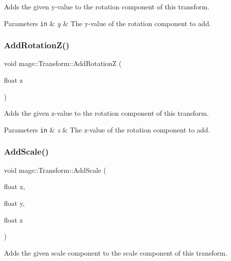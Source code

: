 Adds the given y-\/value to the rotation component of this transform.


\begin{DoxyParams}[1]{Parameters}
\mbox{\tt in}  & {\em y} & The y-\/value of the rotation component to add. \\
\hline
\end{DoxyParams}
\hypertarget{structmage_1_1_transform_ae70e192a7d98366b629c3d75a7d2d3bd}{}\label{structmage_1_1_transform_ae70e192a7d98366b629c3d75a7d2d3bd} 
\subsubsection{\texorpdfstring{Add\+Rotation\+Z()}{AddRotationZ()}}
{\footnotesize\ttfamily void mage\+::\+Transform\+::\+Add\+RotationZ (\begin{DoxyParamCaption}\item[{float}]{z }\end{DoxyParamCaption})}

Adds the given z-\/value to the rotation component of this transform.


\begin{DoxyParams}[1]{Parameters}
\mbox{\tt in}  & {\em z} & The z-\/value of the rotation component to add. \\
\hline
\end{DoxyParams}
\hypertarget{structmage_1_1_transform_a10681b78ac7980fa3aa6c6c11a274f99}{}\label{structmage_1_1_transform_a10681b78ac7980fa3aa6c6c11a274f99} 
\subsubsection{\texorpdfstring{Add\+Scale()}{AddScale()}\hspace{0.1cm}{\footnotesize\ttfamily [1/2]}}
{\footnotesize\ttfamily void mage\+::\+Transform\+::\+Add\+Scale (\begin{DoxyParamCaption}\item[{float}]{x,  }\item[{float}]{y,  }\item[{float}]{z }\end{DoxyParamCaption})}

Adds the given scale component to the scale component of this transform.


